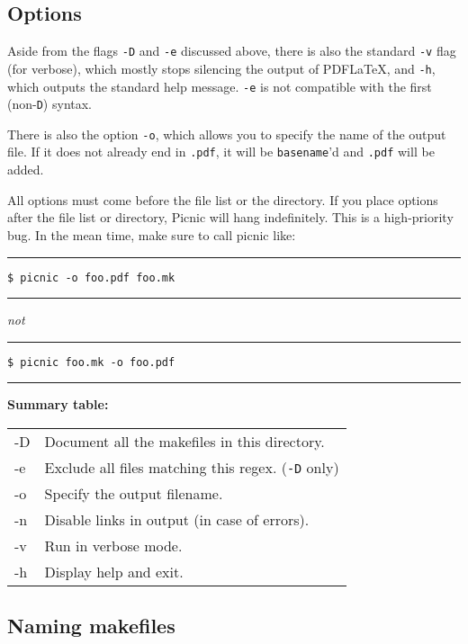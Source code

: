 \documentclass[oneside,11pt]{article}
\newcommand{\bashcmd}[1]{ \hfill\, \begin{minipage}[t]{\linewidth}  \hrule \vspace{0.5\baselineskip} \texttt{\small \$ #1} \vspace{0.5\baselineskip} \hrule \end{minipage} \vspace{0.5\baselineskip} }
\begin{document}
	\subsection{Options}
	
	Aside from the flags \texttt{-D} and \texttt{-e} discussed above, there is also the standard \texttt{-v} flag (for verbose), which mostly stops silencing the output of PDF\LaTeX, and \texttt{-h}, which outputs the standard help message. \texttt{-e} is not compatible with the first (non-\texttt{D}) syntax.
	
	There is also the option \texttt{-o}, which allows you to specify the name of the output file. If it does not already end in \texttt{.pdf}, it will be \texttt{basename}'d and \texttt{.pdf} will be added.
	
	{\color{red} All options must come before the file list or the directory.} If you place options after the file list or directory, Picnic will hang indefinitely. This is a high-priority bug. In the mean time, make sure to call picnic like:	
	\bashcmd{picnic -o foo.pdf foo.mk}
	
	\textit{not}	
	\bashcmd{picnic foo.mk -o foo.pdf}
	
	\begin{minipage}{\textwidth}
		\textbf{Summary table:}	\\
		\begin{tabularx}{\textwidth}{>{\ttfamily}l X}
			
			-D & Document all the makefiles in this directory. \\
			
			-e & Exclude all files matching this regex. (\texttt{-D} only) \\
			
			-o & Specify the output filename. \\
			
			-n & Disable links in output (in case of errors). \\
			
			-v & Run in verbose mode. \\
			
			-h & Display help and exit.  \\
		\end{tabularx}
	\end{minipage}
		
	\subsection{Naming makefiles}
	
\end{document}
